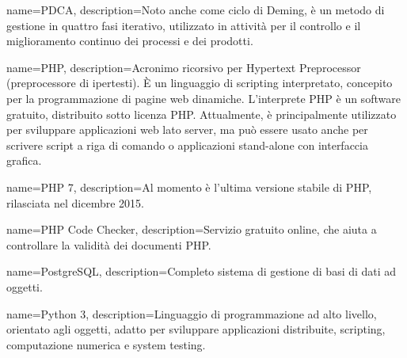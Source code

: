 {
	name=PDCA,
	description={Noto anche come ciclo di Deming, è un metodo di gestione in quattro fasi iterativo, utilizzato in attività per il controllo e il miglioramento continuo dei processi e dei prodotti.}
}

{
	name=PHP,
	description={Acronimo ricorsivo per Hypertext Preprocessor (preprocessore di ipertesti). \MakeUppercase{è} un linguaggio di scripting interpretato, concepito per la programmazione di pagine web dinamiche. L'interprete PHP è un software gratuito, distribuito sotto licenza PHP. Attualmente, è principalmente utilizzato per sviluppare applicazioni web lato server, ma può essere usato anche per scrivere script a riga di comando o applicazioni stand-alone con interfaccia grafica.}
}

{
	name=PHP 7,
	description={Al momento è l'ultima versione stabile di PHP, rilasciata nel dicembre 2015.}
}

{
	name=PHP Code Checker,
	description={Servizio gratuito online, che aiuta a controllare la validità dei documenti PHP.}
}

{
	name=PostgreSQL,
	description={Completo sistema di gestione di basi di dati ad oggetti.}
}

{
	name=Python 3,
	description={Linguaggio di programmazione ad alto livello, orientato agli oggetti, adatto per sviluppare applicazioni distribuite, scripting, computazione numerica e system testing.}
}

